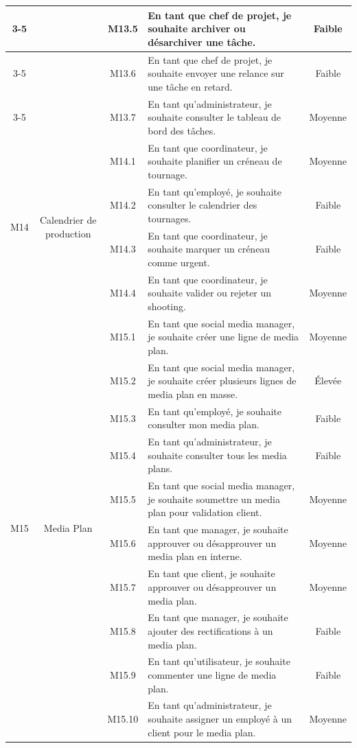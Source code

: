 \begin{longtable}{|c|c|c|p{7.2cm}|c|}
\cline{3-5}
 & & M13.5 & En tant que chef de projet, je souhaite archiver ou désarchiver une tâche. & Faible \\
\cline{3-5}
 & & M13.6 & En tant que chef de projet, je souhaite envoyer une relance sur une tâche en retard. & Faible \\
\cline{3-5}
 & & M13.7 & En tant qu'administrateur, je souhaite consulter le tableau de bord des tâches. & Moyenne \\
\hline
\multirow{4}{*}{M14} & \multirow{4}{*}{Calendrier de production} & M14.1 & En tant que coordinateur, je souhaite planifier un créneau de tournage. & Moyenne \\
\cline{3-5}
 & & M14.2 & En tant qu'employé, je souhaite consulter le calendrier des tournages. & Faible \\
\cline{3-5}
 & & M14.3 & En tant que coordinateur, je souhaite marquer un créneau comme urgent. & Faible \\
\cline{3-5}
 & & M14.4 & En tant que coordinateur, je souhaite valider ou rejeter un shooting. & Moyenne \\
\hline
\multirow{10}{*}{M15} & \multirow{10}{*}{Media Plan} & M15.1 & En tant que social media manager, je souhaite créer une ligne de media plan. & Moyenne \\
\cline{3-5}
 & & M15.2 & En tant que social media manager, je souhaite créer plusieurs lignes de media plan en masse. & Élevée \\
\cline{3-5}
 & & M15.3 & En tant qu'employé, je souhaite consulter mon media plan. & Faible \\
\cline{3-5}
 & & M15.4 & En tant qu'administrateur, je souhaite consulter tous les media plans. & Faible \\
\cline{3-5}
 & & M15.5 & En tant que social media manager, je souhaite soumettre un media plan pour validation client. & Moyenne \\
\cline{3-5}
 & & M15.6 & En tant que manager, je souhaite approuver ou désapprouver un media plan en interne. & Moyenne \\
\cline{3-5}
 & & M15.7 & En tant que client, je souhaite approuver ou désapprouver un media plan. & Moyenne \\
\cline{3-5}
 & & M15.8 & En tant que manager, je souhaite ajouter des rectifications à un media plan. & Faible \\
\cline{3-5}
 & & M15.9 & En tant qu'utilisateur, je souhaite commenter une ligne de media plan. & Faible \\
\cline{3-5}
 & & M15.10 & En tant qu'administrateur, je souhaite assigner un employé à un client pour le media plan. & Moyenne \\
\hline
\end{longtable}
